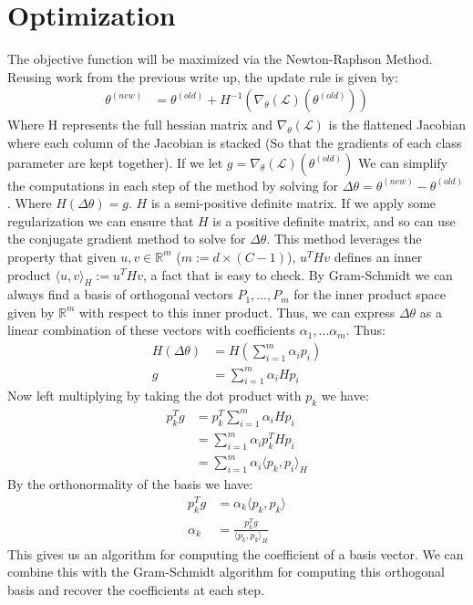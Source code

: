 \documentclass[12pt]{article}
\begin{document}
\section*{Optimization}
The objective function will be maximized via the Newton-Raphson Method. Reusing work from the previous write up,
the update rule is given by:
\begin{align*}
\theta^{(new)} &= \theta^{(old)} + H^{-1}(\nabla_\theta(\mathcal{L})(\theta^{(old)}))
\end{align*}
Where H represents the full hessian matrix and $\nabla_\theta(\mathcal{L})$ is the
flattened Jacobian where each column of the Jacobian is stacked (So that the gradients
of each class parameter are kept together). If we let $g = \nabla_\theta(\mathcal{L})(\theta^{(old)})$
We can simplify the computations in each step of the method by solving for $\Delta \theta = \theta^{(new)} - \theta^{(old)}$.
Where $H(\Delta \theta) = g$. $H$ is a semi-positive definite matrix. If we apply some regularization we can ensure
that $H$ is a positive definite matrix, and so can use the conjugate gradient method to
solve for $\Delta \theta$. This method leverages the property that given $u, v \in \mathbb{R}^{m}$ ($m := d\times(C-1)$),
$u^THv$ defines an inner product $\langle u, v \rangle_H := u^THv$, a fact that is easy to check. By 
Gram-Schmidt we can always find a basis of orthogonal vectors $P_1, \ldots, P_m$ for the inner product space
given by $\mathbb{R}^m$ with respect to this inner product. Thus, we can express $\Delta \theta$ as a linear
combination of these vectors with coefficients $\alpha_1, \ldots \alpha_m$. Thus:
\begin{align*}
H(\Delta \theta) &= \displaystyle H(\sum_{i=1}^{m}\alpha_ip_i) \\
g &= \sum_{i=1}^{m}\alpha_iHp_i
\end{align*}
Now left multiplying by taking the dot product with $p_k$ we have:
\begin{align*}
    p_k^Tg &= \displaystyle p_k^T\sum_{i=1}^{m}\alpha_iHp_i \\
    &= \sum_{i=1}^{m}\alpha_ip_k^THp_i \\
    &= \sum_{i=1}^{m}\alpha_i\langle p_k, p_i \rangle_H
\end{align*}
By the orthonormality of the basis we have:
\begin{align*}
    p_k^Tg &= \alpha_k\langle p_k, p_k \rangle \\
    \alpha_k &= \frac{p_k^Tg}{\langle p_k, p_k \rangle_H}
\end{align*}
This gives us an algorithm for computing the coefficient of a basis vector.
We can combine this with the Gram-Schmidt algorithm for computing this orthogonal
basis and recover the coefficients at each step.
\end{document}

